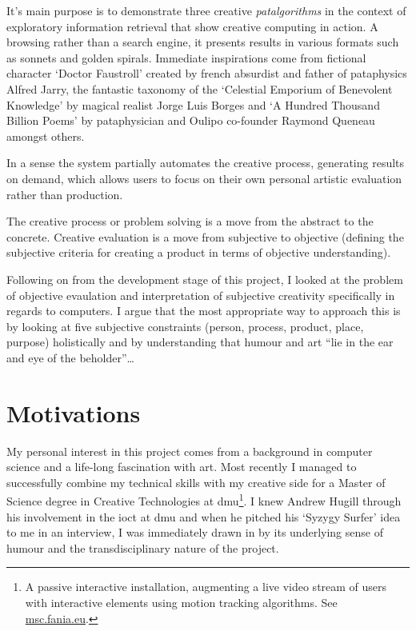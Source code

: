 It's main purpose is to demonstrate three creative \textit{patalgorithms} in the context of exploratory information retrieval that show creative computing in action. A browsing rather than a search engine, it presents results in various formats such as sonnets and golden spirals. Immediate inspirations come from fictional character `Doctor Faustroll' created by french absurdist and father of pataphysics Alfred Jarry, the fantastic taxonomy of the `Celestial Emporium of Benevolent Knowledge' by magical realist Jorge Luis Borges and `A Hundred Thousand Billion Poems' by pataphysician and Oulipo co-founder Raymond Queneau amongst others.

In a sense the system partially automates the creative process, generating results on demand, which allows users to focus on their own personal artistic evaluation rather than production.


\begin{draft}
  The creative process or problem solving is a move from the abstract to the concrete. Creative evaluation is a move from subjective to objective (defining the subjective criteria for creating a product in terms of objective understanding).
\end{draft}

Following on from the development stage of this project, I looked at the problem of objective evaulation and interpretation of subjective creativity specifically in regards to computers. I argue that the most appropriate way to approach this is by looking at five subjective constraints (person, process, product, place, purpose) holistically and by understanding that humour and art ``lie in the ear and eye of the beholder''\ldots


\section{Motivations}

My personal interest in this project comes from a background in computer science and a life-long fascination with art. Most recently I managed to successfully combine my technical skills with my creative side for a Master of Science degree in Creative Technologies at \gls{dmu}\footnote{A passive interactive installation, augmenting a live video stream of users with interactive elements using motion tracking algorithms. See \url{msc.fania.eu}.}. I knew Andrew Hugill through his involvement in the \gls{ioct} at \gls{dmu} and when he pitched his `Syzygy Surfer' \autocite{Hendler2011, Hendler2013} idea to me in an interview, I was immediately drawn in by its underlying sense of humour and the transdisciplinary nature of the project.

